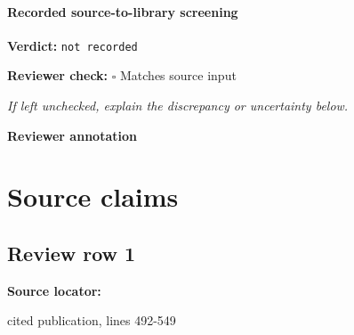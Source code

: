 \documentclass[10pt]{article}
\newcommand{\reviewerbox}{%
  \par\noindent\fbox{\parbox{0.96\linewidth}{\rule{0pt}{0.38in}}}\par
}
\newcommand{\reviewmatch}[1]{%
  \par\noindent\textbf{Reviewer check:} $\square$\; #1\par
  \noindent\emph{If left unchecked, explain the discrepancy or uncertainty below.}\par
}
\begin{document}
\paragraph{Recorded source-to-library screening}
\textbf{Verdict:} \texttt{not recorded}
\reviewmatch{Matches source input}
\noindent\textbf{Reviewer annotation}\par
\reviewerbox

\clearpage
\hypertarget{source-claim-47d64178a8b01b72}{}
\hypertarget{source-section-f10b5f68e4acf3dc}{}
\section*{Source claims}
\subsection*{Review row 1}
\textbf{Source locator:} {\footnotesize\raggedright cited publication, lines 492-\allowbreak{}549\par}
\end{document}
